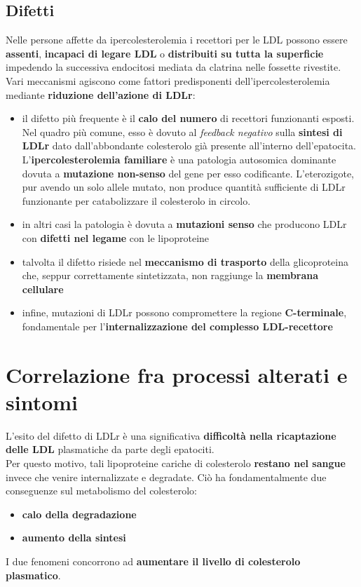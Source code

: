 \documentclass[a4paper, 12pt]{article}
\begin{document}
\begin{titlepage}
\subsection{Difetti}
Nelle persone affette da ipercolesterolemia i recettori per le LDL possono essere \textbf{assenti}, \textbf{incapaci di legare LDL} o \textbf{distribuiti su tutta la superficie} impedendo la successiva endocitosi mediata da clatrina nelle fossette rivestite.\\
Vari meccanismi agiscono come fattori predisponenti dell'ipercolesterolemia mediante \textbf{riduzione dell'azione di LDLr}:
\begin{itemize}
\item il difetto più frequente è il \textbf{calo del numero} di recettori funzionanti esposti. Nel quadro più comune, esso è dovuto al \textit{feedback negativo} sulla \textbf{sintesi di LDLr} dato dall'abbondante colesterolo già presente all'interno dell'epatocita.\\ L'\textbf{ipercolesterolemia familiare} è una patologia autosomica dominante dovuta a \textbf{mutazione non-senso} del gene per esso codificante. L'eterozigote, pur avendo un solo allele mutato, non produce quantità sufficiente di LDLr funzionante per catabolizzare il colesterolo in circolo.
\item in altri casi la patologia è dovuta a \textbf{mutazioni senso} che producono LDLr con \textbf{difetti nel legame} con le lipoproteine
\item talvolta il difetto risiede nel \textbf{meccanismo di trasporto} della glicoproteina che, seppur correttamente sintetizzata, non raggiunge la \textbf{membrana cellulare}
\item infine, mutazioni di LDLr possono compromettere la regione \textbf{C-terminale}, fondamentale per l'\textbf{internalizzazione del complesso LDL-recettore}
\end{itemize}

\section{Correlazione fra processi alterati e sintomi}
L'esito del difetto di LDLr è una significativa \textbf{difficoltà nella ricaptazione delle LDL} plasmatiche da parte degli epatociti.\\
Per questo motivo, tali lipoproteine cariche di colesterolo \textbf{restano nel sangue} invece che venire internalizzate e degradate. Ciò ha fondamentalmente due conseguenze sul metabolismo del colesterolo:
\begin{itemize}
\item \textbf{calo della degradazione}
\item \textbf{aumento della sintesi}
\end{itemize}
I due fenomeni concorrono ad \textbf{aumentare il livello di colesterolo plasmatico}.


\end{titlepage}
\end{document}
